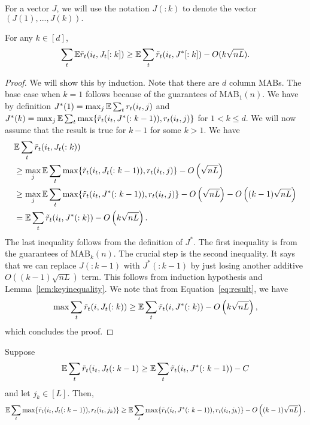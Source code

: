 For a vector $J$, we will use the notation $J(:k)$ to denote the vector $(J(1),...,J(k)).$
\begin{lemma}
\label{lem:keylem}
For any $k \in [d]$,
$$ \sum_t \mathbb{E} \tilde{r}_t(i_t, J_t[:k]) \geq  \mathbb{E} \sum_t \tilde{r}_t(i_t, J^*[:k]) - O(k\sqrt{nL}).$$ 
\end{lemma}
\begin{proof}
We will show this by induction. Note that there are $d$ column MABs. The base case when $k=1$ follows because of the guarantees of MAB$_1(n)$.
We have by definition $J^*(1) = \max_j   \mathbb{E} \sum_t  {r}_t(i_t, j) $ and $J^*(k) = \max_{j} \mathbb{E} \sum_t   \max \{  \tilde{r}_t(i_t, J^*(:k-1)), r_t(i_t,j) \}$ for $1 < k \leq d$.   We will now assume that the result is true for $k-1$ for some $k>1.$
We have 
\begin{align}
& \mathbb{E}  \sum_t \tilde{r}_t(i_t, J_t(:k))   \\
&\geq \max_{j} \mathbb{E} \sum_t   \max \{ \tilde{r}_t(i_t, J_t(:k-1)), r_t(i_t,j) \}  - O\left(\sqrt{nL}\right) \\
&\geq \max_{j} \mathbb{E} \sum_t   \max \{  \tilde{r}_t(i_t, J^*(:k-1)), r_t(i_t,j) \}   - O\left( \sqrt{nL} \right) - O\left( (k-1)\sqrt{nL} \right)   \\
\label{eq:result}
& =  \mathbb{E} \sum_t  \tilde{r}_t(i_t, J^*(:k))  - O\left( k\sqrt{nL} \right).
\end{align}
The last inequality follows from the definition of $J^*.$
The first inequality is from the guarantees of MAB$_k(n)$.  The crucial step is  the second inequality. It says that we can replace $J(:k-1)$ with $J^*(:k-1)$ by just losing another additive $O\left( (k-1) \sqrt{nL} \right)$ term. This follows from induction hypothesis and Lemma~\ref{lem:keyinequality}. We note that from Equation~\ref{eq:result}, we have
$$ \max  \sum_t \tilde{r}_t(i, J_t(:k))  \geq  \mathbb{E} \sum_t \tilde{r}_t(i, J^*(:k))  - O\left( k \sqrt{nL} \right),$$
which concludes the proof.
\end{proof}


\begin{lemma}
\label{lem:keyinequality}
Suppose
 $$ \mathbb{E} \sum_t \tilde{r}_t(i_t, J_t(:k-1) \geq  \mathbb{E} \sum_t \tilde{r}_t(i_t, J^*(:k-1))  - C$$
  and let $j_k \in [L].$ Then,
$$ \mathbb{E} \sum_t \max \{ \tilde{r}_t(i_t, J_t(:k-1)), r_t(i_t,j_k) \} \geq \mathbb{E} \sum_t  \max \{ \tilde{r}_t(i_t, J^*(:k-1)), r_t(i_t,j_k) \} - O\left((k-1) \sqrt{nL} \right).$$
\end{lemma}

